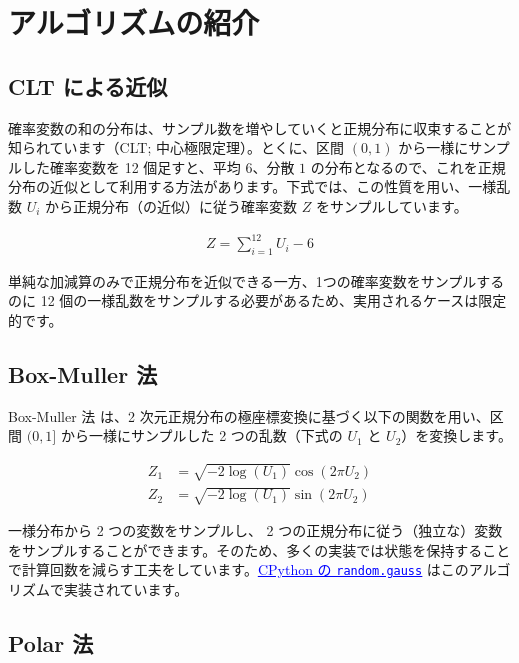 \documentclass[twocolumn, dvipdfmx]{jsarticle}
\begin{document}
\section*{アルゴリズムの紹介}

\subsection*{CLT による近似}

確率変数の和の分布は、サンプル数を増やしていくと正規分布に収束することが知られています（CLT; 中心極限定理）。とくに、区間 $(0, 1)$ から一様にサンプルした確率変数を 12 個足すと、平均 $6$、分散 $1$ の分布となるので、これを正規分布の近似として利用する方法があります。下式では、この性質を用い、一様乱数 $U_i$ から正規分布（の近似）に従う確率変数 $Z$ をサンプルしています。

\begin{align*}
    Z = \sum_{i=1}^{12} U_i - 6
\end{align*}

単純な加減算のみで正規分布を近似できる一方、1つの確率変数をサンプルするのに 12 個の一様乱数をサンプルする必要があるため、実用されるケースは限定的です。

\subsection*{Box-Muller 法}

Box-Muller 法 \cite{box1958note} は、2 次元正規分布の極座標変換に基づく以下の関数を用い、区間 $(0, 1]$ から一様にサンプルした 2 つの乱数（下式の $U_1$ と $U_2$）を変換します。

\begin{align*}
    Z_1 &= \sqrt{-2 \log (U_1)} \cos(2 \pi U_2) \\
    Z_2 &= \sqrt{-2 \log (U_1)} \sin(2 \pi U_2)
\end{align*}

一様分布から 2 つの変数をサンプルし、 2 つの正規分布に従う（独立な）変数をサンプルすることができます。そのため、多くの実装では状態を保持することで計算回数を減らす工夫をしています。\href{https://github.com/python/cpython/blob/b0dfc7581697f20385813582de7e92ba6ba0105f/Lib/random.py#L550-L586}{\textcolor{blue}{\underline{CPython の \texttt{random.gauss}}}} はこのアルゴリズムで実装されています。

\subsection*{Polar 法}
\end{document}
